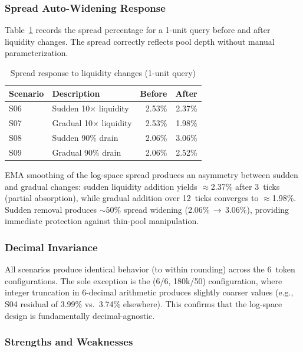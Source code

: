 \documentclass[10pt,a4paper,twocolumn]{article}
\theoremstyle{definition}
\theoremstyle{plain}
\theoremstyle{remark}
\begin{document}
\subsubsection{Spread Auto-Widening Response}

Table~\ref{tab:scenario-spread} records the spread percentage for a 1-unit query before and after liquidity changes. The spread correctly reflects pool depth without manual parameterization.

\begin{table}[H]
\centering
\small
\caption{Spread response to liquidity changes (1-unit query)}
\label{tab:scenario-spread}
\begin{tabularx}{0.95\columnwidth}{@{}l X r r@{}}
\toprule
Scenario & Description & Before & After \\
\midrule
S06 & Sudden 10$\times$ liquidity & 2.53\% & 2.37\% \\
S07 & Gradual 10$\times$ liquidity & 2.53\% & 1.98\% \\
S08 & Sudden 90\% drain & 2.06\% & 3.06\% \\
S09 & Gradual 90\% drain & 2.06\% & 2.52\% \\
\bottomrule
\end{tabularx}
\end{table}

EMA smoothing of the log-space spread produces an asymmetry between sudden and gradual changes: sudden liquidity addition yields $\approx$2.37\% after 3~ticks (partial absorption), while gradual addition over 12~ticks converges to $\approx$1.98\%. Sudden removal produces ${\sim}50\%$ spread widening (2.06\%\,$\to$\,3.06\%), providing immediate protection against thin-pool manipulation.

\subsubsection{Decimal Invariance}

All scenarios produce identical behavior (to within rounding) across the 6~token configurations. The sole exception is the (6/6, 180k/50) configuration, where integer truncation in 6-decimal arithmetic produces slightly coarser values (e.g., S04 residual of 3.99\% vs.\ 3.74\% elsewhere). This confirms that the log-space design is fundamentally decimal-agnostic.

\subsubsection{Strengths and Weaknesses}
\end{document}
